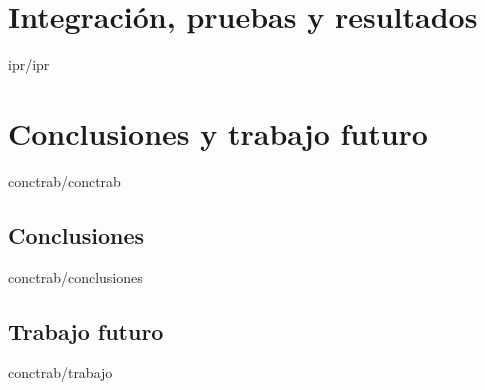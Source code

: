 \documentclass[epsbased,copyright,final,printable,covers,extendedindex,firstnumbered,tfg,gnuplot]{tfgtfmthesisuam}
\begin{document}
\chapter{Integración, pruebas y resultados\label{CAP:IPR}}{ipr/ipr}
\chapter{Conclusiones y trabajo futuro\label{CAP:CONCTRAB}}{conctrab/conctrab}
   \section{Conclusiones\label{SEC:CONCLUSIONES}}{conctrab/conclusiones}
   \section{Trabajo futuro\label{SEC:TRABAJO}}{conctrab/trabajo}
\appendix

\begin{comment}
\chapter{Word\textsuperscript{\textregistered} vs. \LaTeXe\label{CAP:WORDLATEX}}{varios/wordlatex}
\chapter{Instalación\label{CAP:INSTALACION}}{varios/instalacion}
\chapter{Packetes incluidos\label{CAP:PAQUETES}}{varios/paquetes}
\chapter{Resumen de opciones del estilo\label{CAP:OPCIONES}}{varios/opciones}
\chapter{Funciones y entornos\label{CAP:FUNCENT}}{varios/funciones}
\end{comment}
\end{document}
